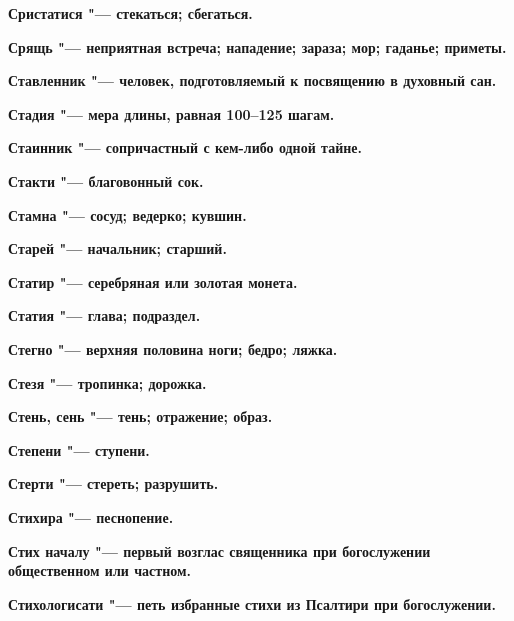 \begin{mymulticols}{2}
\bfseries Сристатися\normalfont{} "--- стекаться; сбегаться. 




\bfseries Срящь\normalfont{} "--- неприятная встреча; нападение; зараза; мор; гаданье; приметы. 




\bfseries Ставленник\normalfont{} "--- человек, подготовляемый к посвящению в духовный сан. 




\bfseries Стадия\normalfont{} "--- мера длины, равная 100--125 шагам. 




\bfseries Стаинник\normalfont{} "--- сопричастный с кем-либо одной тайне. 




\bfseries Стакти\normalfont{} "--- благовонный сок. 




\bfseries Стамна\normalfont{} "--- сосуд; ведерко; кувшин. 




\bfseries Старей\normalfont{} "--- начальник; старший. 




\bfseries Статир\normalfont{} "--- серебряная или золотая монета. 




\bfseries Статия\normalfont{} "--- глава; подраздел. 




\bfseries Стегно\normalfont{} "--- верхняя половина ноги; бедро; ляжка. 




\bfseries Стезя\normalfont{} "--- тропинка; дорожка. 




\bfseries Стень, сень\normalfont{} "--- тень; отражение; образ. 




\bfseries Степени\normalfont{} "--- ступени. 




\bfseries Стерти\normalfont{} "--- стереть; разрушить. 




\bfseries Стихира\normalfont{} "--- песнопение. 




\bfseries Стих началу\normalfont{} "--- первый возглас священника при богослужении общественном или частном. 




\bfseries Стихологисати\normalfont{} "--- петь избранные стихи из Псалтири при богослужении. 





\end{mymulticols}
